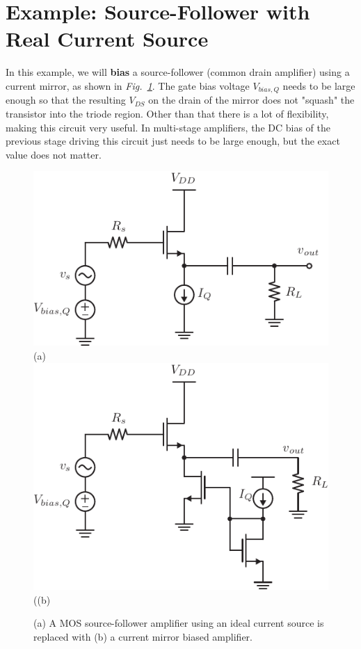 \section{Example:  Source-Follower with Real Current Source}
In this example, we will \textbf{bias} a source-follower (common drain amplifier) using a current mirror, as shown in \emph{Fig.~\ref{fig:cd_amp_dc}}.  The gate bias voltage $V_{bias,Q}$ needs to be large enough so that the resulting $V_{DS}$ on the drain of the mirror does not "squash" the transistor into the triode region.  Other than that there is a lot of flexibility, making this circuit very useful.  In multi-stage amplifiers, the DC bias of the previous stage driving this circuit just needs to be large enough, but the exact value does not matter.
\vspace{0.5cm}
\begin{figure}[H]
\centering
\includegraphics[scale=1.35]{cd_amp_dc}\\
(a)\\[1cm]
\includegraphics[scale=1.35]{cd_amp_dc_mirror}\\
((b)\\
\caption{(a) A MOS source-follower amplifier using an ideal current source is replaced with (b) a current mirror biased amplifier.}
\label{fig:cd_amp_dc}
\end{figure}
